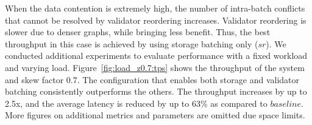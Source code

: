 When the data contention is extremely high, the number of intra-batch conflicts
that cannot be resolved by validator reordering increases. Validator reordering
is slower due to denser graphs, while bringing less benefit. Thus, the best throughput in this case is achieved by using storage batching only ($sr$). 
We conducted additional experiments to evaluate performance with a fixed workload and varying load. Figure~\ref{fig:load_z0.7:tps} shows the throughput of the system and skew factor 0.7. The configuration that enables both storage and validator batching consistently outperforms the others. The throughput increases by up to 2.5x, and the average latency is reduced by up to 63\% as compared to $baseline$. More figures on additional metrics and parameters are omitted due space limits.


